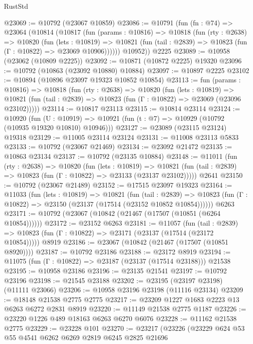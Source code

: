 \begin{lexlean}{RustStd}
\begin{coremodule}
@23069 := @10792 (@23067 @10859)
@23086 := @10791
    (fun (fn : @74) =>
    @23064
      (@10814
        (@10817
          (fun (params : @10816) =>
          @10818
            (fun (rty : @2638) =>
            @10820
              (fun (lets : @10819) =>
              @10821 (fun (tail : @2839) => @10823 (fun (Γ : @10822) => @23069 @10906))))))
        @10952))
    @2225
@23089 := @10958 (@23062 (@10809 @2225))
@23092 := @10871 (@10872 @2225) @19320
@23096 := @10792 (@10863 (@23092 @10880) @10884)
@23097 := @10897 @2225
@23102 := @10894 (@10896 @23097 @19323 @10852 @10854)
@23113 := fun (params : @10816) =>
  @10818
    (fun (rty : @2638) =>
    @10820
      (fun (lets : @10819) =>
      @10821 (fun (tail : @2839) => @10823 (fun (Γ : @10822) => @23069 (@23096 @23102)))))
@23114 := @10817 @23113
@23115 := @10814 @23114
@23124 := @10920
    (fun (U : @10919) => @10921 (fun (t : @7) => @10929 (@10792 (@10935 @19320 @10810) @10946)))
@23127 := @23089 (@23115 @23124) @19318
@23129 := @11005 @23114 @23124
@23131 := @11008 @23113 @5833
@23133 := @10792 (@23067 @21469)
@23134 := @23092 @21472
@23135 := @10863 @23134
@23137 := @10792 (@23135 @10884)
@23148 := @11011
    (fun (rty : @2638) =>
    @10820
      (fun (lets : @10819) =>
      @10821 (fun (tail : @2839) => @10823 (fun (Γ : @10822) => @23133 (@23137 @23102)))))
    @2641
@23150 := @10792 (@23067 @21489)
@23152 := @17515 @23097 @19323
@23164 := @11033
    (fun (lets : @10819) =>
    @10821
      (fun (tail : @2839) =>
      @10823 (fun (Γ : @10822) => @23150 (@23137 (@17514 (@23152 @10852 @10854))))))
    @6263
@23171 := @10792 (@23067 (@10842 (@21467 (@17507 (@10851 (@6264 @10854))))))
@23172 := @23152 @6263
@23181 := @11057
    (fun (tail : @2839) => @10823 (fun (Γ : @10822) => @23171 (@23137 (@17514 (@23172 @10854)))))
    @8919
@23186 := @23067 (@10842 (@21467 (@17507 (@10851 @8920))))
@23187 := @10792 @23186
@23188 := @23172 @8919
@23194 := @11075 (fun (Γ : @10822) => @23187 (@23137 (@17514 @23188))) @21538
@23195 := @10958 @23186
@23196 := @23135 @21541
@23197 := @10792 @23196
@23198 := @21545 @23188
@23202 := @23195 (@23197 @23198) (@11111 @23066)
@23206 := @10958 @23196 @23198 (@11116 @23134)
@23209 := @18148 @21538 @2775 @2775
@23217 := @23209 @1227 @1683 @2223 @13 @6263 @6272 @2831 @8919
@23220 := @11149 @21538 @2775 @1187
@23226 := @23220 @1226 @489 @18163 @6263 @6270 @6076
@23228 := @11162 @21538 @2775
@23229 := @23228 @101
@23270 := @23217
    (@23226
      (@23229
        @624
        @53
        @55
        @4541
        @6262
        @6269
        @2819
        @6245
        @2825
        @21696

\end{coremodule}
\end{lexlean}
